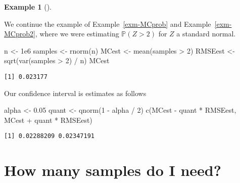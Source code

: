 \documentclass[
  letterpaper,
  DIV=11,
  numbers=noendperiod]{scrreprt}
\newenvironment{Shaded}{\begin{snugshade}}{\end{snugshade}}
\newcommand{\DecValTok}[1]{\textcolor[rgb]{0.68,0.00,0.00}{#1}}
\newcommand{\FloatTok}[1]{\textcolor[rgb]{0.68,0.00,0.00}{#1}}
\newcommand{\FunctionTok}[1]{\textcolor[rgb]{0.28,0.35,0.67}{#1}}
\newcommand{\NormalTok}[1]{\textcolor[rgb]{0.00,0.23,0.31}{#1}}
\newcommand{\OtherTok}[1]{\textcolor[rgb]{0.00,0.23,0.31}{#1}}
\newcommand{\SpecialCharTok}[1]{\textcolor[rgb]{0.37,0.37,0.37}{#1}}
\theoremstyle{plain}
\theoremstyle{definition}
\theoremstyle{definition}
\newtheorem{example}{Example}[chapter]
\theoremstyle{remark}
\begin{document}
\begin{example}[]\protect\hypertarget{exm-MCprob3}{}\label{exm-MCprob3}

We continue the example of Example~\ref{exm-MCprob} and
Example~\ref{exm-MCprob2}, where we were estimating \(\mathbb P(Z > 2)\)
for \(Z\) a standard normal.

\begin{Shaded}
\begin{Highlighting}[]
\NormalTok{n }\OtherTok{\textless{}{-}} \FloatTok{1e6}
\NormalTok{samples }\OtherTok{\textless{}{-}} \FunctionTok{rnorm}\NormalTok{(n)}
\NormalTok{MCest   }\OtherTok{\textless{}{-}} \FunctionTok{mean}\NormalTok{(samples }\SpecialCharTok{\textgreater{}} \DecValTok{2}\NormalTok{)}
\NormalTok{RMSEest }\OtherTok{\textless{}{-}} \FunctionTok{sqrt}\NormalTok{(}\FunctionTok{var}\NormalTok{(samples }\SpecialCharTok{\textgreater{}} \DecValTok{2}\NormalTok{) }\SpecialCharTok{/}\NormalTok{ n)}
\NormalTok{MCest}
\end{Highlighting}
\end{Shaded}

\begin{verbatim}
[1] 0.023177
\end{verbatim}

Our confidence interval is estimates as follows

\begin{Shaded}
\begin{Highlighting}[]
\NormalTok{alpha }\OtherTok{\textless{}{-}} \FloatTok{0.05}
\NormalTok{quant }\OtherTok{\textless{}{-}} \FunctionTok{qnorm}\NormalTok{(}\DecValTok{1} \SpecialCharTok{{-}}\NormalTok{ alpha }\SpecialCharTok{/} \DecValTok{2}\NormalTok{)}
\FunctionTok{c}\NormalTok{(MCest }\SpecialCharTok{{-}}\NormalTok{ quant }\SpecialCharTok{*}\NormalTok{ RMSEest, MCest }\SpecialCharTok{+}\NormalTok{ quant }\SpecialCharTok{*}\NormalTok{ RMSEest)}
\end{Highlighting}
\end{Shaded}

\begin{verbatim}
[1] 0.02288209 0.02347191
\end{verbatim}

\end{example}

\section{How many samples do I need?}\label{how-many-samples-do-i-need}
\end{document}
